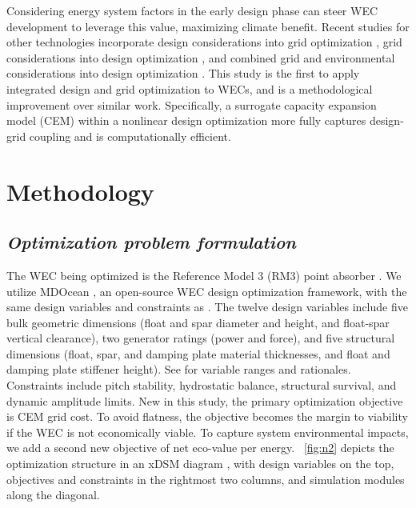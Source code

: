 \documentclass[10pt,twoside]{article}
\begin{document}
Considering energy system factors in the early design phase can steer WEC development to leverage this value, maximizing climate benefit.
Recent studies for other technologies incorporate design considerations into grid optimization \cite{schwartz_value_2023,ricks_value_2022}, grid considerations into design optimization \cite{mehta_designing_2024}, and combined grid and environmental considerations into design optimization \cite{canet_eco-conscious_2023,kainz_how_2024}.
This study is the first to apply integrated design and grid optimization to WECs, and is a methodological improvement over similar work. 
Specifically, a surrogate capacity expansion model (CEM) within a nonlinear design optimization more fully captures design-grid coupling and is computationally efficient.

\section{Methodology}
\subsection{\textit{Optimization problem formulation}}
The WEC being optimized is the Reference Model 3 (RM3) point absorber \cite{RM3}.
We utilize MDOcean \cite{mccabe_mdocean_2024}, an open-source WEC design optimization framework, with the same design variables and constraints as \cite{mccabe_leveraging_2025}.
The twelve design variables include five bulk geometric dimensions (float and spar diameter and height, and float-spar vertical clearance), two generator ratings (power and force), and five structural dimensions (float, spar, and damping plate material thicknesses, and float and damping plate stiffener height).
See \cite{mccabe_leveraging_2025} for variable ranges and rationales.
Constraints include pitch stability, hydrostatic balance, structural survival, and dynamic amplitude limits.
New in this study, the primary optimization objective is CEM grid cost.
To avoid flatness, the objective becomes the margin to viability if the WEC is not economically viable.
To capture system environmental impacts, we add a second new objective of net eco-value per energy.
\figureautorefname~\ref{fig:n2} depicts the optimization structure in an xDSM diagram \cite{lambe_extensions_2012}, with design variables on the top, objectives and constraints in the rightmost two columns, and simulation modules along the diagonal.
\end{document}
